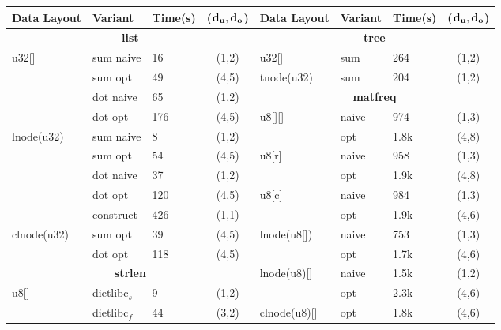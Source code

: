 \begin{figure}[H]
\begin{scriptsize}
\begin{tabular}{@{}l@{\hspace{5px}}l@{\hspace{5px}}l@{\hspace{5px}}cl@{\hspace{5px}}l@{\hspace{5px}}l@{\hspace{5px}}c@{}}
\toprule
{\bf Data Layout} & {\bf Variant} & {\bf Time(s)} & {\bf (${\tt \bf d_u,d_o}$)} & {\bf Data Layout} & {\bf Variant} & {\bf Time(s)} & {\bf (${\tt \bf d_u,d_o}$)} \\
\midrule
\multicolumn{4}{c}{\bf list} &                               \multicolumn{4}{c}{\bf tree} \\
u32[] & sum naive & 16 & (1,2) &                             u32[] & sum & 264 & (1,2) \\
      & sum opt & 49 & (4,5) &                               tnode(u32) & sum & 204 & (1,2) \\
      & dot naive & 65 & (1,2) &                             \multicolumn{4}{c}{\bf matfreq} \\
      & dot opt & 176 & (4,5) &                              u8[][] & naive & 974 & (1,3) \\
lnode(u32) & sum naive & 8 & (1,2) &                         & opt & 1.8k & (4,8) \\
           & sum opt & 54 & (4,5) &                          u8[r] & naive & 958 & (1,3) \\
           & dot naive & 37 & (1,2) &                        & opt & 1.9k & (4,8) \\
           & dot opt & 120 & (4,5) &                         u8[c] & naive & 984 & (1,3) \\
           & construct & 426 & (1,1) &                       & opt & 1.9k & (4,6) \\
clnode(u32) & sum opt & 39 & (4,5) &                         lnode(u8[]) & naive & 753 & (1,3) \\
            & dot opt & 118 & (4,5) &                        & opt & 1.7k & (4,6) \\
\multicolumn{4}{c}{\bf strlen}   &                           lnode(u8)[] & naive & 1.5k & (1,2) \\
u8[] & dietlibc$_s$ & 9 & (1,2) &             & opt & 2.3k & (4,6) \\
       & dietlibc$_f$ & 44 & (3,2) &           clnode(u8)[] & opt & 1.8k & (4,6) \\

\end{tabular}
\end{scriptsize}
\end{figure}
